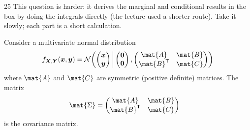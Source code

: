 \documentclass{sotonExamBoxes}    %
\begin{document}
\begin{question}{25}
  This question is harder: it derives the marginal and conditional
  results in the box by doing the integrals directly (the lecture
  used a shorter route).  Take it slowly; each part is a short
  calculation.

  Consider a multivariate normal distribution
  \begin{align*}
    f_{\bm{X},\bm{Y}}(\bm{x}, \bm{y}) = \mathcal{N}
    \!\left( \begin{pmatrix}\bm{x}\\ \bm{y}\end{pmatrix}
    \,\middle|\, \begin{pmatrix} \bm{0} \\
      \bm{0} \end{pmatrix}, \begin{pmatrix} \mat{A} & \mat{B}\\
      \mat{B}^{\tr} & \mat{C} \end{pmatrix} \right) 
  \end{align*}
  where $\mat{A}$ and $\mat{C}$ are symmetric (positive definite)
  matrices.  The matrix
  \begin{align*}
    \mat{\Sigma} &= \begin{pmatrix} \mat{A} & \mat{B}\\ \mat{B}^{\tr} & \mat{C} \end{pmatrix}
  \end{align*}
  is the covariance matrix.


\end{question}
\end{document}
